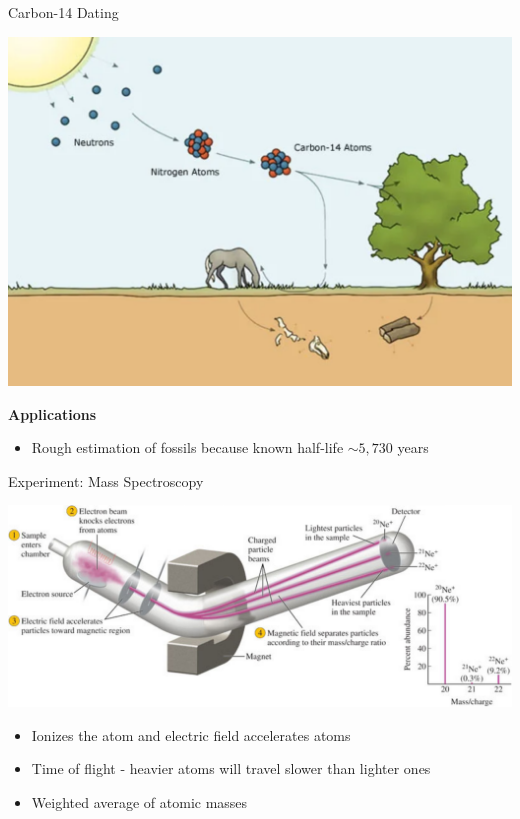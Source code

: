 \documentclass[11pt]{beamer}
\begin{document}
\begin{frame}{Carbon-14 Dating}
  \begin{center}
    \includegraphics[width=0.75\linewidth]{carbon_14_dating}
  \end{center}

  \textbf{Applications}
  
  \begin{itemize}
  \item Rough estimation of fossils because known half-life $\sim 5,730$ years
  \end{itemize}
\end{frame}

\begin{frame}{Experiment: Mass Spectroscopy}
  \begin{center}
    \includegraphics[width=\linewidth]{mass_spect}
  \end{center}

  \begin{itemize}
  \item Ionizes the atom and electric field accelerates atoms
  \item Time of flight - heavier atoms will travel slower
    than lighter ones
  \item Weighted average of atomic masses
  \end{itemize}  
\end{frame}
\end{document}
